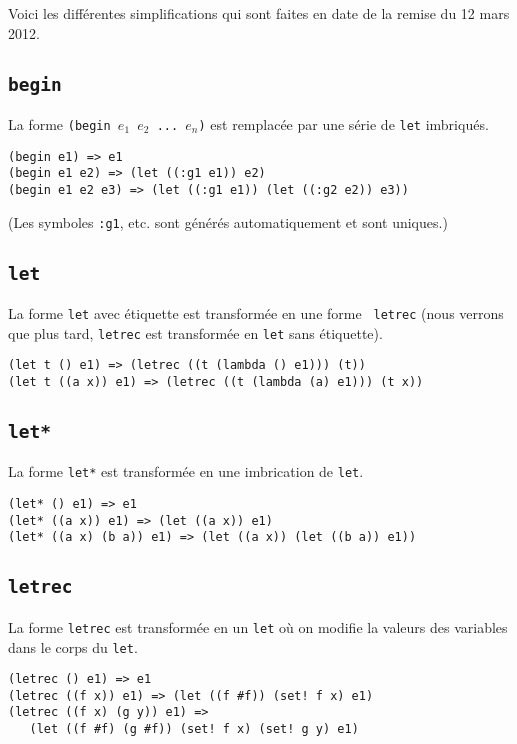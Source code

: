 \documentclass[11pt]{report}
\begin{document}
Voici les différentes simplifications qui sont faites en date de la
remise du 12 mars 2012.

\subsection{\tt begin}

La forme {\tt (begin $e_1$ $e_2$ ... $e_n$)} est remplacée par une
série de {\tt let} imbriqués.


\begin{verbatim}
(begin e1) => e1
(begin e1 e2) => (let ((:g1 e1)) e2)
(begin e1 e2 e3) => (let ((:g1 e1)) (let ((:g2 e2)) e3))
\end{verbatim}

(Les symboles {\tt :g1}, etc. sont générés automatiquement et sont
uniques.)

\subsection{\tt let}

La forme {\tt let} avec étiquette est transformée en une forme {\tt
  letrec} (nous verrons que plus tard, {\tt letrec} est transformée
en {\tt let} sans étiquette).

\begin{verbatim}
(let t () e1) => (letrec ((t (lambda () e1))) (t))
(let t ((a x)) e1) => (letrec ((t (lambda (a) e1))) (t x))
\end{verbatim}


\subsection{\tt let*}

La forme {\tt let*} est transformée en une imbrication de {\tt let}.

\begin{verbatim}
(let* () e1) => e1
(let* ((a x)) e1) => (let ((a x)) e1)
(let* ((a x) (b a)) e1) => (let ((a x)) (let ((b a)) e1))
\end{verbatim}


\subsection{\tt letrec}

La forme {\tt letrec} est transformée en un {\tt let} où on modifie la
valeurs des variables dans le corps du {\tt let}.

\begin{verbatim}
(letrec () e1) => e1
(letrec ((f x)) e1) => (let ((f #f)) (set! f x) e1)
(letrec ((f x) (g y)) e1) =>
   (let ((f #f) (g #f)) (set! f x) (set! g y) e1)
\end{verbatim}
\end{document}
